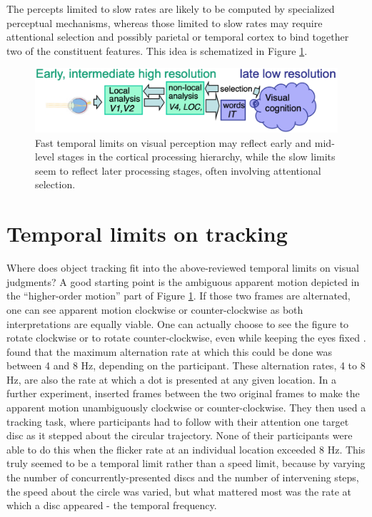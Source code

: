 \documentclass[
]{book}
\begin{document}
The percepts limited to slow rates are likely to be computed by specialized perceptual mechanisms, whereas those limited to slow rates may require attentional selection and possibly parietal or temporal cortex to bind together two of the constituent features. This idea is schematized in Figure \ref{fig:slowFastBoxesArrows}.

\begin{figure}
\includegraphics[width=1\linewidth]{imagesForRmd/temporalLimitsPerception/lowLevelFastHighLevelSlowBoxesArrows} \caption{Fast temporal limits on visual perception may reflect early and mid-level stages in the cortical processing hierarchy, while the slow limits seem to reflect later processing stages, often involving attentional selection.}\label{fig:slowFastBoxesArrows}
\end{figure}

\hypertarget{temporal-limits-on-tracking}{%
\section{Temporal limits on tracking}\label{temporal-limits-on-tracking}}

Where does object tracking fit into the above-reviewed temporal limits on visual judgments? A good starting point is the ambiguous apparent motion depicted in the ``higher-order motion'' part of Figure \ref{fig:slowFastBoxesArrows}. If those two frames are alternated, one can see apparent motion clockwise or counter-clockwise as both interpretations are equally viable. One can actually choose to see the figure to rotate clockwise or to rotate counter-clockwise, even while keeping the eyes fixed \citep{wertheimerExperimentelleStudienUber1912}. \citet{verstratenLimitsAttentiveTracking2000} found that the maximum alternation rate at which this could be done was between 4 and 8 Hz, depending on the participant. These alternation rates, 4 to 8 Hz, are also the rate at which a dot is presented at any given location. In a further experiment, \citet{verstratenLimitsAttentiveTracking2000} inserted frames between the two original frames to make the apparent motion unambiguously clockwise or counter-clockwise. They then used a tracking task, where participants had to follow with their attention one target disc as it stepped about the circular trajectory. None of their participants were able to do this when the flicker rate at an individual location exceeded 8 Hz. This truly seemed to be a temporal limit rather than a speed limit, because by varying the number of concurrently-presented discs and the number of intervening steps, the speed about the circle was varied, but what mattered most was the rate at which a disc appeared - the temporal frequency.
\end{document}
